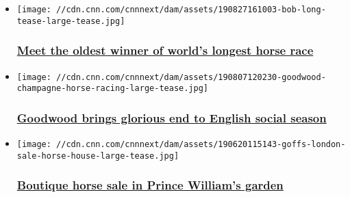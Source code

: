 \begin{itemize}
\item
  \href{/2019/08/30/sport/mongol-derby-bob-long-mongolia-horse-racing-spt-intl/index.html}{}

  \texttt{[image: //cdn.cnn.com/cnnnext/dam/assets/190827161003-bob-long-tease-large-tease.jpg]}

  \hypertarget{meet-the-oldest-winner-of-worlds-longest-horse-race-}{%
  \subsubsection{\texorpdfstring{\href{/2019/08/30/sport/mongol-derby-bob-long-mongolia-horse-racing-spt-intl/index.html}{Meet
  the oldest winner of world's longest horse race
  }}{Meet the oldest winner of world's longest horse race }}\label{meet-the-oldest-winner-of-worlds-longest-horse-race-}}
\end{itemize}

\begin{itemize}
\item
  \href{/2019/08/08/sport/glorious-goodwood-horse-racing-winning-post-spt-intl/index.html}{}

  \texttt{[image: //cdn.cnn.com/cnnnext/dam/assets/190807120230-goodwood-champagne-horse-racing-large-tease.jpg]}

  \hypertarget{goodwood-brings-glorious-end-to-english-social-season}{%
  \subsubsection{\texorpdfstring{\href{/2019/08/08/sport/glorious-goodwood-horse-racing-winning-post-spt-intl/index.html}{Goodwood
  brings glorious end to English social
  season}}{Goodwood brings glorious end to English social season}}\label{goodwood-brings-glorious-end-to-english-social-season}}
\end{itemize}

\begin{itemize}
\item
  \href{/2019/06/26/sport/horse-racing-goffs-sale-london-spt-intl-gbr/index.html}{}

  \texttt{[image: //cdn.cnn.com/cnnnext/dam/assets/190620115143-goffs-london-sale-horse-house-large-tease.jpg]}

  \hypertarget{boutique-horse-sale-in-prince-williams-garden}{%
  \subsubsection{\texorpdfstring{\href{/2019/06/26/sport/horse-racing-goffs-sale-london-spt-intl-gbr/index.html}{Boutique
  horse sale in Prince William's
  garden}}{Boutique horse sale in Prince William's garden}}\label{boutique-horse-sale-in-prince-williams-garden}}
\end{itemize}

